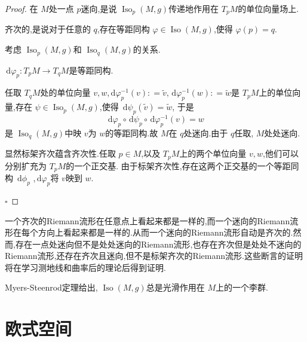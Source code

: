 \documentclass[../../几何与拓扑.tex]{subfiles}
\begin{document}
\begin{proof}
    在 \(  M  \)处一点 \(  p  \)迷向,是说  \(  \operatorname{Iso} _{p}\left( M,g \right)   \)传递地作用在 \(  T_{p}M  \)的单位向量场上.

齐次的,是说对于任意的 \(  q  \),存在等距同构 \(   \varphi \in \operatorname{Iso} \left( M,g \right)   \),使得 \(   \varphi \left( p \right)= q   \).

考虑 \(  \operatorname{Iso} _{p}\left( M,g \right)   \)和 \(  \operatorname{Iso} _{q}\left( M,g \right)   \)的关系.

 \(  \,\mathrm{d}  \varphi _{p}:T_{p}M\to T_{q}M  \)是等距同构.
 
 任取 \(  T_{q}M  \)处的单位向量 \(  v,w  \),\(  \,\mathrm{d}  \varphi _{p}^{-1} \left( v \right): =  \tilde{v},\,\mathrm{d}  \varphi _{p}^{-1} \left( w \right)    : =  \tilde{w}\)是 \(  T_{p}M  \)上的单位向量,存在 \(  \psi  \in \operatorname{Iso} _{p}\left( M,g \right)   \),使得 \( \,\mathrm{d}  \psi _{p}\left( \tilde{v} \right)= \tilde{w}   \),  于是 \[
 \,\mathrm{d}  \varphi _{p}\circ \,\mathrm{d} \psi _{p}\circ \,\mathrm{d}  \varphi _{p}^{-1} \left( v \right)= w 
 \]     是 \(  \operatorname{Iso} _{q}\left( M,g \right)   \)中映 \(  v  \)为 \(  w  \)的等距同构.故 \(  M  \)在 \(  q  \)处迷向.由于 \(  q  \)任取, \(  M  \)处处迷向.

 显然标架齐次蕴含齐次性.任取 \(  p \in M  \),以及 \(  T_{p}M  \)上的两个单位向量 \(  v,w  \),他们可以分别扩充为 \(  T_{p}M  \)的一个正交基.  由于标架齐次性,存在这两个正交基的一个等距同构 \(  \,\mathrm{d} \phi _{p}  \) ,\(  \,\mathrm{d}  \varphi _{p}  \)将 \(  v  \)映到 \(  w  \).   

    \hfill $\square$
\end{proof}       

\begin{note}
    一个齐次的Riemann流形在任意点上看起来都是一样的,而一个迷向的Riemann流形在每个方向上看起来都是一样的.从而一个迷向的Riemann流形自动是齐次的.然而,存在一点处迷向但不是处处迷向的Riemann流形,也存在齐次但是处处不迷向的Riemann流形,还存在齐次且迷向,但不是标架齐次的Riemann流形.这些断言的证明将在学习测地线和曲率后的理论后得到证明.

    Myers-Steenrod定理给出, \(  \operatorname{Iso} \left( M,g \right)   \)总是光滑作用在 \(  M  \)上的一个李群.  
\end{note}

\section{欧式空间}
\end{document}
